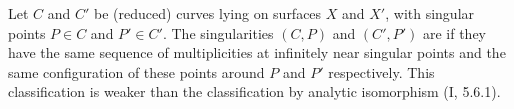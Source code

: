 Let $C$ and $C'$ be (reduced) curves lying on surfaces $X$ and $X'$, with singular points $P \in C$ and $P' \in C'$. The singularities $(C,P)$ and $(C',P')$ are  if they have the same sequence of multiplicities at infinitely near singular points and the same configuration of these points around $P$ and $P'$ respectively. This classification is weaker than the classification by analytic isomorphism (I, 5.6.1).
